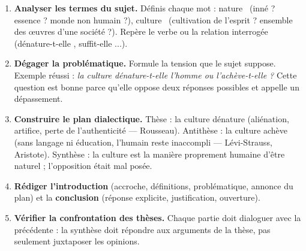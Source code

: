 \documentclass[11pt]{article}
\begin{document}
\begin{methode}
\begin{enumerate}
  \item \textbf{Analyser les termes du sujet.} Définis chaque mot : \guillemotleft nature \guillemotright\ (inné ? essence ? monde non humain ?), \guillemotleft culture \guillemotright\ (cultivation de l'esprit ? ensemble des œuvres d'une société ?). Repère le verbe ou la relation interrogée (\guillemotleft dénature-t-elle \guillemotright, \guillemotleft suffit-elle \guillemotright...).
  \item \textbf{Dégager la problématique.} Formule la tension que le sujet suppose. Exemple réussi : \emph{la culture dénature-t-elle l'homme ou l'achève-t-elle ?} Cette question est bonne parce qu'elle oppose deux réponses possibles et appelle un dépassement.
  \item \textbf{Construire le plan dialectique.} Thèse : la culture dénature (aliénation, artifice, perte de l'authenticité — Rousseau). Antithèse : la culture achève (sans langage ni éducation, l'humain reste inaccompli — Lévi-Strauss, Aristote). Synthèse : la culture est la manière proprement humaine d'être naturel ; l'opposition était mal posée.
  \item \textbf{Rédiger l'introduction} (accroche, définitions, problématique, annonce du plan) et la \textbf{conclusion} (réponse explicite, justification, ouverture).
  \item \textbf{Vérifier la confrontation des thèses.} Chaque partie doit dialoguer avec la précédente : la synthèse doit répondre aux arguments de la thèse, pas seulement juxtaposer les opinions.
\end{enumerate}
\end{methode}
\end{document}
